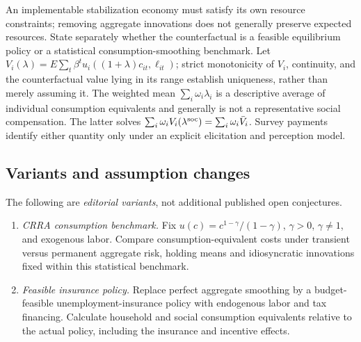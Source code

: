 \documentclass[11pt,a4paper]{article}
\begin{document}
An implementable stabilization economy must satisfy its own resource constraints; removing aggregate innovations does not generally preserve expected resources. State separately whether the counterfactual is a feasible equilibrium policy or a statistical consumption-smoothing benchmark. Let \(V_i(\lambda)=E\sum_t\beta^tu_i((1+\lambda)c_{it},\ell_{it})\); strict monotonicity of \(V_i\), continuity, and the counterfactual value lying in its range establish uniqueness, rather than merely assuming it. The weighted mean \(\sum_i\omega_i\lambda_i\) is a descriptive average of individual consumption equivalents and generally is not a representative social compensation. The latter solves \(\sum_i\omega_iV_i(\lambda^{\rm soc})=\sum_i\omega_i\bar V_i\). Survey payments identify either quantity only under an explicit elicitation and perception model.
\subsection*{Variants and assumption changes}
The following are \emph{editorial variants}, not additional published open conjectures.
\begin{enumerate}
\item \emph{CRRA consumption benchmark.} Fix \(u(c)=c^{1-\gamma}/(1-\gamma)\), \(\gamma>0\), \(\gamma\ne1\), and exogenous labor. Compare consumption-equivalent costs under transient versus permanent aggregate risk, holding means and idiosyncratic innovations fixed within this statistical benchmark.
\item \emph{Feasible insurance policy.} Replace perfect aggregate smoothing by a budget-feasible unemployment-insurance policy with endogenous labor and tax financing. Calculate household and social consumption equivalents relative to the actual policy, including the insurance and incentive effects.
\end{enumerate}
\end{document}
